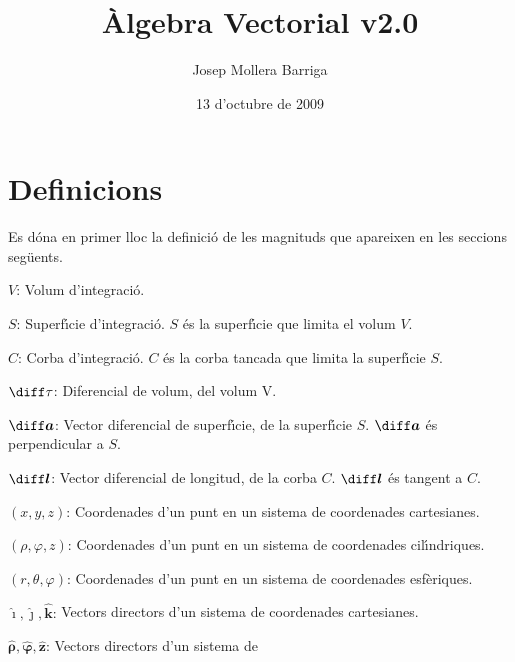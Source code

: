 \documentclass[catalan,a4paper,twoside,11pt]{article}
\begin{document}
\title{\`{A}lgebra Vectorial v2.0}
\author{Josep Mollera Barriga}
\date{13 d'octubre de 2009}
\maketitle

\begin{multicols}{2}
\scriptsize \tableofcontents
\end{multicols}

\section{Definicions}

Es d\'{o}na  en primer lloc la definici\'{o} de les magnituds que
apareixen en les seccions seg\"{u}ents.

\begin{list}{}
{\setlength{\labelwidth}{14mm}
\setlength{\leftmargin}{16mm}\setlength{\labelsep}{2mm}}
   \item[$V$:] Volum d'integraci\'{o}.
   \item[$S$:]  Superf\'{\i}cie d'integraci\'{o}. $S$ \'{e}s la superf\'{\i}cie que
   limita el volum $V$.
   \item[$C$:] Corba d'integraci\'{o}. $C$ \'{e}s la corba tancada que
   limita la superf\'{\i}cie $S$.
   \item[$\diff\tau$:] Diferencial de volum, del volum V.
   \item[$\boldsymbol{\diff a}$:] Vector diferencial de superf\'{\i}cie, de la superf\'{\i}cie
   $S$. $\boldsymbol{\diff a}$ \'{e}s perpendicular a $S$.
   \item[$\boldsymbol{\diff l}$:] Vector diferencial de longitud, de la corba
   $C$. $\boldsymbol{\diff l}$ \'{e}s tangent a $C$.
   \item[$(x,y,z)$:] Coordenades d'un punt en un sistema de
   coordenades cartesianes.
   \item[$(\rho,\varphi,z)$:] Coordenades d'un punt en un sistema de
   coordenades cil\'{\i}ndriques.
   \item[$(r,\theta,\varphi)$:] Coordenades d'un punt en un sistema de
   coordenades esf\`{e}riques.
   \item[$\boldsymbol{\hat{\imath}},\boldsymbol{\hat{\jmath}},\boldsymbol{\hat{k}}$:]
   Vectors directors d'un sistema de  coordenades
   cartesianes.
   \item[$\boldsymbol{\hat{\rho}},\boldsymbol{\hat{\varphi}},\boldsymbol{\hat{z}}$:] Vectors directors d'un sistema de

\end{list}
\end{document}

